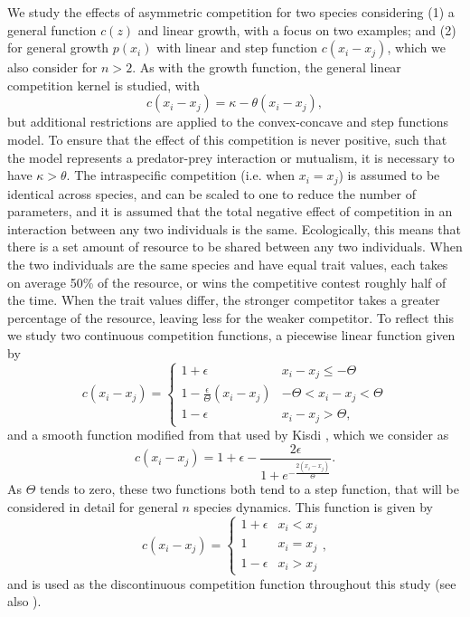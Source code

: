 We study the effects of asymmetric competition for two species considering (1) a general function $c(z)$ and linear growth, with a focus on two examples; and (2) for general growth  $p(x_i)$ with linear and step function $c(x_i - x_j)$, which we also consider for $n>2$. As with the growth function, the general linear competition kernel is studied, with
 \begin{equation}
 \label{linearc}
 c(x_i - x_j)=\kappa - \theta (x_i - x_j),
 \end{equation}
but additional restrictions are applied to the convex-concave and step functions model. To ensure that the effect of this competition is never positive, such that the model represents a predator-prey interaction or mutualism, it is necessary to have $\kappa>\theta$. The intraspecific competition (i.e. when $x_i=x_j$) is assumed to be identical across species, and can be scaled to one to reduce the number of parameters, and it is assumed that the total negative effect of competition in an interaction between any two individuals is the same. Ecologically, this means that there is a set amount of resource to be shared between any two individuals. When the two individuals are the same species and have equal trait values, each takes on average 50\% of the resource, or wins the competitive contest roughly half of the time. When the trait values differ, the stronger competitor takes a greater percentage of the resource, leaving less for the weaker competitor. To reflect this we study two continuous competition functions, a piecewise linear function given by 
\begin{equation}
\label{pwlcomp}
c(x_i-x_j)=\begin{cases}
1+\epsilon & x_i-x_j\leq-\Theta \\
1-\frac{\epsilon}{\Theta}(x_i-x_j) & -\Theta<x_i-x_j<\Theta \\
1-\epsilon & x_i-x_j >\Theta, 
\end{cases}
\end{equation}
and a smooth function modified from that used by Kisdi \cite{kisdi1999evolutionary}, which we consider as
\begin{equation}
\label{kisdimodified}
c(x_i-x_j)=1+\epsilon -\frac{2\epsilon}{1+e^{-\frac{2(x_i-x_j)}{\Theta}}}.
\end{equation}
As $\Theta$ tends to zero, these two functions both tend to a step function, that will be considered in detail for general $n$ species dynamics. This  function is given by
 \begin{equation}
 \label{stepc}
 c(x_i - x_j)=\begin{cases}
 1+\epsilon & x_i <x_j \\
 1 & x_i = x_j \\
 1-\epsilon & x_i > x_j
 \end{cases},
 \end{equation}
and is used as the discontinuous competition function throughout this study (see also \cite{tilman1994competition, may1994superinfection}).
 
